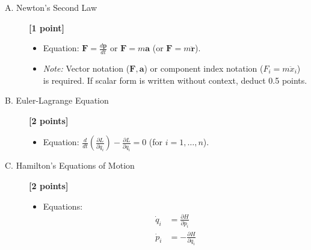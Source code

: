 \documentclass[11pt, a4paper]{article} %
\begin{document}
\begin{description}
    \item[A. Newton's Second Law] \hfill \textbf{[1 point]}
    \begin{itemize}
        \item Equation: $\mathbf{F} = \frac{d\mathbf{p}}{dt}$ or $\mathbf{F} = m\mathbf{a}$ (or $\mathbf{F} = m\ddot{\mathbf{r}}$).
        \item \textit{Note:} Vector notation ($\mathbf{F}, \mathbf{a}$) or component index notation ($F_i = m \ddot{x}_i$) is required. If scalar form is written without context, deduct 0.5 points.
    \end{itemize}

    \item[B. Euler-Lagrange Equation] \hfill \textbf{[2 points]}
    \begin{itemize}
        \item Equation: $\frac{d}{dt}\left(\frac{\partial L}{\partial \dot{q}_i}\right) - \frac{\partial L}{\partial q_i} = 0$ (for $i = 1, \dots, n$).
    \end{itemize}

    \item[C. Hamilton's Equations of Motion] \hfill \textbf{[2 points]}
    \begin{itemize}
        \item Equations: 
        \begin{align*}
            \dot{q}_i &= \frac{\partial H}{\partial p_i} \\
            \dot{p}_i &= -\frac{\partial H}{\partial q_i}
        \end{align*}
    \end{itemize}
\end{description}
\end{document}
